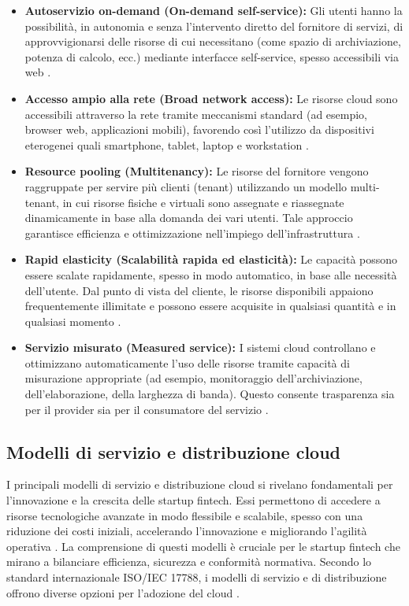 \begin{itemize}
  \item \textbf{Autoservizio on-demand (On-demand self-service):} Gli utenti hanno la possibilità, in autonomia e senza l'intervento diretto del fornitore di servizi, di approvvigionarsi delle risorse di cui necessitano (come spazio di archiviazione, potenza di calcolo, ecc.) mediante interfacce self-service, spesso accessibili via web \cite{nist800-145}.

  \item \textbf{Accesso ampio alla rete (Broad network access):} Le risorse cloud sono accessibili attraverso la rete tramite meccanismi standard (ad esempio, browser web, applicazioni mobili), favorendo così l'utilizzo da dispositivi eterogenei quali smartphone, tablet, laptop e workstation \cite{nist800-145}.

  \item \textbf{Resource pooling (Multitenancy):} Le risorse del fornitore vengono raggruppate per servire più clienti (tenant) utilizzando un modello multi-tenant, in cui risorse fisiche e virtuali sono assegnate e riassegnate dinamicamente in base alla domanda dei vari utenti. Tale approccio garantisce efficienza e ottimizzazione nell'impiego dell'infrastruttura \cite{nist800-145}.

  \item \textbf{Rapid elasticity (Scalabilità rapida ed elasticità):} Le capacità possono essere scalate rapidamente, spesso in modo automatico, in base alle necessità dell'utente. Dal punto di vista del cliente, le risorse disponibili appaiono frequentemente illimitate e possono essere acquisite in qualsiasi quantità e in qualsiasi momento \cite{nist800-145}.

  \item \textbf{Servizio misurato (Measured service):} I sistemi cloud controllano e ottimizzano automaticamente l'uso delle risorse tramite capacità di misurazione appropriate (ad esempio, monitoraggio dell'archiviazione, dell'elaborazione, della larghezza di banda). Questo consente trasparenza sia per il provider sia per il consumatore del servizio \cite{nist800-145}.
\end{itemize}

\subsection{Modelli di servizio e distribuzione cloud}

I principali modelli di servizio e distribuzione cloud si rivelano fondamentali per l'innovazione e la crescita delle startup fintech. Essi permettono di accedere a risorse tecnologiche avanzate in modo flessibile e scalabile, spesso con una riduzione dei costi iniziali, accelerando l'innovazione e migliorando l'agilità operativa \cite{vats2024systematic, hrmars2025cloud}.
La comprensione di questi modelli è cruciale per le startup fintech che mirano a bilanciare efficienza, sicurezza e conformità normativa. Secondo lo standard internazionale ISO/IEC 17788, i modelli di servizio e di distribuzione offrono diverse opzioni per l'adozione del cloud \cite{iso2018overview}.

